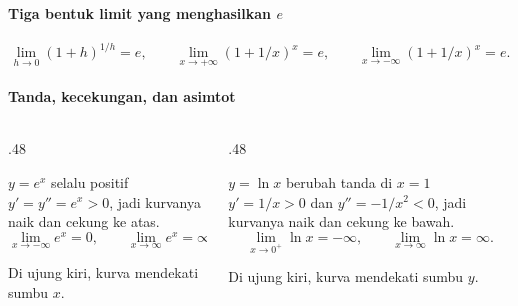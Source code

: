 \documentclass{../../kalkulus-ppt}
\begin{document}
\begin{frame}{\insertsection}
    \framesubtitle{Tiga bentuk limit yang menghasilkan $e$}
    \begin{teorema}
        \[
            \lim_{h\to0}(1+h)^{1/h}=e,\qquad
            \lim_{x\to+\infty}(1+1/x)^x=e,\qquad
            \lim_{x\to-\infty}(1+1/x)^x=e.
        \]
    \end{teorema}
\end{frame}

\begin{frame}{\insertsection}
    \framesubtitle{Tanda, kecekungan, dan asimtot}
    \begin{columns}[t,onlytextwidth]
        \begin{column}{.48\textwidth}
            \begin{block}{$y=e^x$ selalu positif}
                $y'=y''=e^x>0$, jadi kurvanya naik dan cekung ke atas.
                \[
                    \lim_{x\to-\infty}e^x=0,\qquad
                    \lim_{x\to\infty}e^x=\infty.
                \]
            \end{block}
            Di ujung kiri, kurva mendekati sumbu $x$.
        \end{column}
        \begin{column}{.48\textwidth}
            \begin{block}{$y=\ln x$ berubah tanda di $x=1$}
                $y'=1/x>0$ dan $y''=-1/x^2<0$, jadi kurvanya naik dan cekung ke bawah.
                \[
                    \lim_{x\to0^+}\ln x=-\infty,\qquad
                    \lim_{x\to\infty}\ln x=\infty.
                \]
            \end{block}
            Di ujung kiri, kurva mendekati sumbu $y$.
        \end{column}
    \end{columns}
\end{frame}
\end{document}
